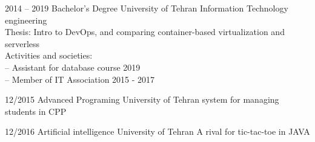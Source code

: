 \begin{entrylist}
    \entry
    {2014 -- 2019}
    {Bachelor's Degree}
    {University of Tehran}
    {
        Information Technology engineering \\
        Thesis: Intro to DevOps, and comparing container-based virtualization and serverless \\
        Activities and societies: \\
        -- Assistant for database course 2019 \\
        -- Member of IT Association 2015 - 2017 \\
    }
\end{entrylist}


\begin{entrylist}
    \entry
    {12/2015}
    {Advanced Programing}
    {University of Tehran}
    {system for managing students in CPP}
\end{entrylist}
\begin{entrylist}
    \entry
    {12/2016}
    {Artificial intelligence}
    {University of Tehran}
    {A rival for tic-tac-toe in JAVA}
\end{entrylist}






